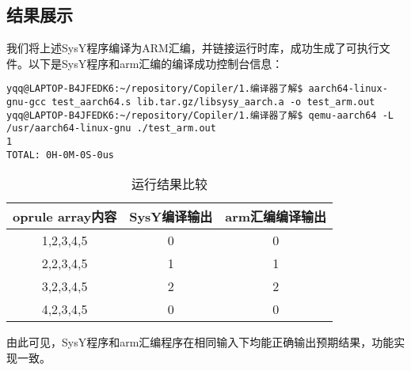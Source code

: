 \documentclass[UTF8,a4paper,10pt]{ctexart}
\begin{document}
\subsection{结果展示}
我们将上述SysY程序编译为ARM汇编，并链接运行时库，成功生成了可执行文件。以下是SysY程序和arm汇编的编译成功控制台信息：
\begin{lstlisting}[title=运行成功信息,frame=trbl]
yqq@LAPTOP-B4JFEDK6:~/repository/Copiler/1.编译器了解$ aarch64-linux-gnu-gcc test_aarch64.s lib.tar.gz/libsysy_aarch.a -o test_arm.out
yqq@LAPTOP-B4JFEDK6:~/repository/Copiler/1.编译器了解$ qemu-aarch64 -L /usr/aarch64-linux-gnu ./test_arm.out
1
TOTAL: 0H-0M-0S-0us
\end{lstlisting}
\begin{table}[!htbp]
  \centering
\begin{tabular}{ccc}
		oprule
	array内容 & SysY编译输出 & arm汇编编译输出 \\
	\midrule
	1,2,3,4,5 & 0 & 0 \\
	2,2,3,4,5 & 1 & 1 \\
	3,2,3,4,5 & 2 & 2 \\
	4,2,3,4,5 & 0 & 0 \\
	\bottomrule
\end{tabular}
  \caption{运行结果比较}
\end{table}
由此可见，SysY程序和arm汇编程序在相同输入下均能正确输出预期结果，功能实现一致。




\end{document}
